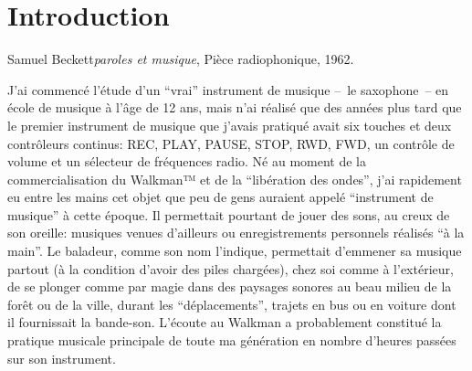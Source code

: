 %
\chapter{Introduction}
\label{ch:introduction}
%

{Samuel Beckett}{\textit{paroles et musique}, Pièce radiophonique, 1962.\\\cite{beckett_comeet_2014}}


\vspace*{\fill}



\noindent J'ai commencé l'étude d'un ``vrai'' instrument de musique --~le saxophone~-- en école de musique à l'âge de 12 ans, mais n'ai réalisé que des années plus tard que le premier instrument de musique que j'avais pratiqué avait six touches et deux contrôleurs continus: REC, PLAY, PAUSE, STOP, RWD, FWD, un contrôle de volume et un sélecteur de fréquences radio. Né au moment de la commercialisation du Walkman™ et de la ``libération des ondes'', j'ai rapidement eu entre les mains cet objet que peu de gens auraient appelé ``instrument de musique'' à cette époque. Il permettait pourtant de jouer des sons, au creux de son oreille: musiques venues d'ailleurs ou enregistrements personnels réalisés ``à la main''. Le baladeur, comme son nom l'indique, permettait d'emmener sa musique partout (à la condition d'avoir des piles chargées), chez soi comme à l'extérieur, de se plonger comme par magie dans des paysages sonores au beau milieu de la forêt ou de la ville, durant les ``déplacements'', trajets en bus ou en voiture dont il fournissait la bande-son. L'écoute au Walkman a probablement constitué la pratique musicale principale de toute ma génération en nombre d'heures passées sur son instrument.

